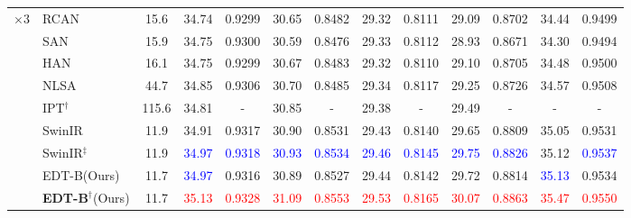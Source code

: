 \documentclass[runningheads]{llncs}
\begin{document}
\begin{table}[t]
\begin{center}
{\begin{tabular}{| c | l | c | c | c | c | c | c | c | c | c | c | c |}
					\multirow{9}{*}{$\times 3$} & RCAN~\cite{zhang2018image} & 15.6 & 34.74 & 0.9299 & 30.65 & 0.8482 & 29.32 & 0.8111 & 29.09 & 0.8702 & 34.44 & 0.9499 \\
					~ & SAN~\cite{dai2019second} & 15.9 & 34.75 & 0.9300 & 30.59 & 0.8476 & 29.33 & 0.8112 & 28.93 & 0.8671 & 34.30 & 0.9494 \\
~ & HAN~\cite{niu2020single} & 16.1 & 34.75 & 0.9299 & 30.67 & 0.8483 & 29.32 & 0.8110 & 29.10 & 0.8705 & 34.48 & 0.9500 \\
					~ & NLSA~\cite{mei2021image} & 44.7 & 34.85 & 0.9306 & 30.70 & 0.8485 & 29.34 & 0.8117 & 29.25 & 0.8726 & 34.57 & 0.9508 \\
					~ & IPT$^\dagger$~\cite{chen2021pre} & 115.6 & 34.81 & - & 30.85 & - & 29.38 & - & 29.49 & - & - & - \\
					~ & SwinIR~\cite{liang2021swinir} & 11.9 & 34.91 & 0.9317 & 30.90 & 0.8531 & 29.43 & 0.8140 & 29.65 & 0.8809 & 35.05 & 0.9531 \\
					~ & SwinIR{$^\ddagger$}~\cite{liang2021swinir} & 11.9 & \textcolor{blue}{34.97} & \textcolor{blue}{0.9318} & \textcolor{blue}{30.93} & \textcolor{blue}{0.8534} & \textcolor{blue}{29.46} & \textcolor{blue}{0.8145} & \textcolor{blue}{29.75} & \textcolor{blue}{0.8826} & 35.12 & \textcolor{blue}{0.9537} \\
					~ & EDT-B(Ours) & 11.7 & \textcolor{blue}{34.97} & 0.9316 & 30.89 & 0.8527 & 29.44 & 0.8142 & 29.72 & 0.8814 & \textcolor{blue}{35.13} & 0.9534 \\
					~ & \textbf{EDT-B}$^\dagger$(Ours) & 11.7 & \textcolor{red}{35.13} & \textcolor{red}{0.9328} & \textcolor{red}{31.09} & \textcolor{red}{0.8553} & \textcolor{red}{29.53} & \textcolor{red}{0.8165} & \textcolor{red}{30.07} & \textcolor{red}{0.8863} & \textcolor{red}{35.47} & \textcolor{red}{0.9550} \\
					\hline
					

\end{tabular}}
\end{center}
\end{table}
\end{document}
